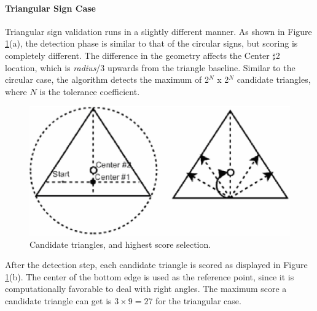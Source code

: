 \documentclass[review,number]{elsarticle}
\begin{document}
\paragraph{Triangular Sign Case}
Triangular sign validation runs in a slightly different manner. As shown in Figure \ref{signfig14}(a), the detection phase is similar to that of the circular signs, but scoring is completely different. The difference in the geometry affects the Center $\sharp$2 location, which is \textit{radius}/3 upwards from the triangle baseline. Similar to the circular case, the algorithm detects the maximum of 2$^\textit{N}$ x 2$^\textit{N}$ candidate triangles, where $\textit{N}$ is the tolerance coefficient. 
\begin{figure}[ht]
\begin{center}
\includegraphics[scale=0.5]{img/signfig14.eps}
\caption{Candidate triangles, and highest score selection.}
\label{signfig14}
\end{center}
\end{figure}
\par
After the detection step, each candidate triangle is scored as displayed in Figure \ref{signfig14}(b). The center of the bottom edge is used as the reference point, since it is computationally favorable to deal with right angles. The maximum score a candidate triangle can get is $3 \times 9 = 27$ for the triangular case. 
\end{document}
